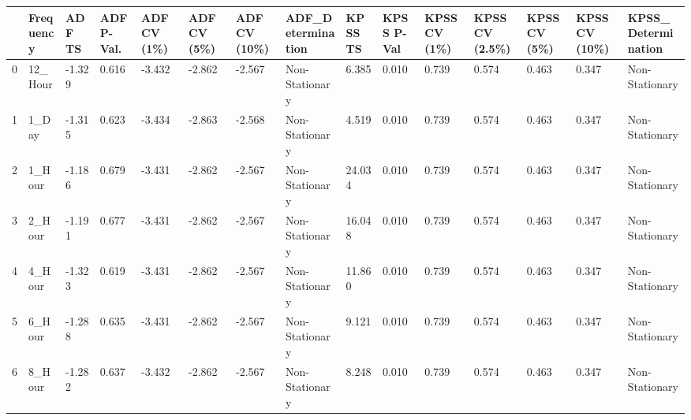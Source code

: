 \begin{tabular}{lllllllllllllll}
\toprule
 & Frequency & ADF TS & ADF P-Val. & ADF CV (1\%) & ADF CV (5\%) & ADF CV (10\%) & ADF_Determination & KPSS TS & KPSS P-Val & KPSS CV (1\%) & KPSS CV (2.5\%) & KPSS CV (5\%) & KPSS CV (10\%) & KPSS_Determination \\
\midrule
0 & 12_Hour & -1.329 & 0.616 & -3.432 & -2.862 & -2.567 & Non-Stationary & 6.385 & 0.010 & 0.739 & 0.574 & 0.463 & 0.347 & Non-Stationary \\
1 & 1_Day & -1.315 & 0.623 & -3.434 & -2.863 & -2.568 & Non-Stationary & 4.519 & 0.010 & 0.739 & 0.574 & 0.463 & 0.347 & Non-Stationary \\
2 & 1_Hour & -1.186 & 0.679 & -3.431 & -2.862 & -2.567 & Non-Stationary & 24.034 & 0.010 & 0.739 & 0.574 & 0.463 & 0.347 & Non-Stationary \\
3 & 2_Hour & -1.191 & 0.677 & -3.431 & -2.862 & -2.567 & Non-Stationary & 16.048 & 0.010 & 0.739 & 0.574 & 0.463 & 0.347 & Non-Stationary \\
4 & 4_Hour & -1.323 & 0.619 & -3.431 & -2.862 & -2.567 & Non-Stationary & 11.860 & 0.010 & 0.739 & 0.574 & 0.463 & 0.347 & Non-Stationary \\
5 & 6_Hour & -1.288 & 0.635 & -3.431 & -2.862 & -2.567 & Non-Stationary & 9.121 & 0.010 & 0.739 & 0.574 & 0.463 & 0.347 & Non-Stationary \\
6 & 8_Hour & -1.282 & 0.637 & -3.432 & -2.862 & -2.567 & Non-Stationary & 8.248 & 0.010 & 0.739 & 0.574 & 0.463 & 0.347 & Non-Stationary \\
\bottomrule
\end{tabular}
